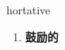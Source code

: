 
\begin{frame}
{\huge hortative}
\begin{center}
\begin{enumerate}\Large
  \item \textbf{鼓励的}
\end{enumerate}
\end{center}
\end{frame}
